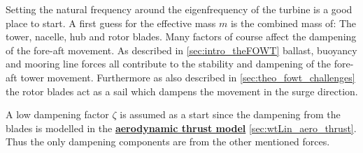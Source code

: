 Setting the natural frequency around the eigenfrequency of the turbine is a good place to start. A first guess for the effective mass $ m $ is the combined mass of: The tower, nacelle, hub and rotor blades. Many factors of course affect the dampening of the fore-aft movement. As described in \cref{sec:intro_theFOWT} ballast, buoyancy and mooring line forces all contribute to the stability and dampening of the fore-aft tower movement. Furthermore as also described in \cref{sec:theo_fowt_challenges} the rotor blades act as a sail which dampens the movement in the surge direction.

A low dampening factor $ \zeta $ is assumed as a start since the dampening from the blades is modelled in the \hyperref[sec:wtLin_aero_thrust]{\textbf{aerodynamic thrust model}} \cref{sec:wtLin_aero_thrust}. Thus the only dampening components are from the other mentioned forces.


